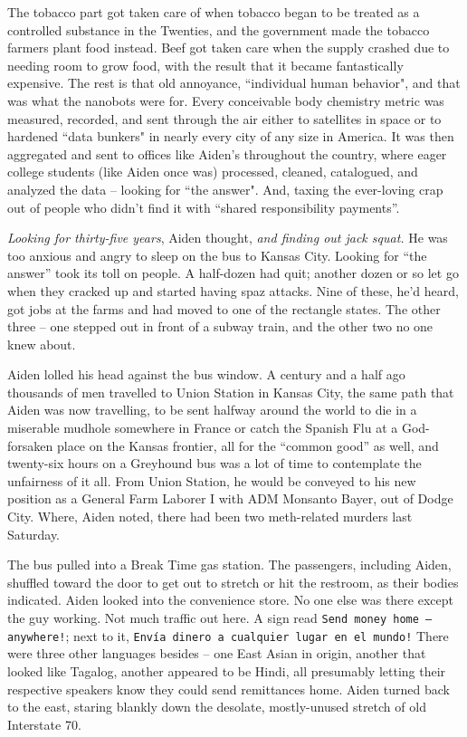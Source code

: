 \documentclass[11pt]{book}
\begin{document}
	The tobacco part got taken care of when tobacco began to be treated as a controlled substance in the Twenties, and the government made the tobacco farmers plant food instead. Beef got taken care when the supply crashed due to needing room to grow food, with the result that it became fantastically expensive. The rest is that old annoyance, ``individual human behavior", and that was what the nanobots were for. Every conceivable body chemistry metric was measured, recorded, and sent through the air either to satellites in space or to hardened ``data bunkers" in nearly every city of any size in America. It was then aggregated and sent to offices like Aiden's throughout the country, where eager college students (like Aiden once was) processed, cleaned, catalogued, and analyzed the data -- looking for ``the answer". And, taxing the ever-loving crap out of people who didn't find it with ``shared responsibility payments''.
	
	\textit{Looking for thirty-five years}, Aiden thought, \textit{and finding out jack squat.} He was too anxious and angry to sleep on the bus to Kansas City. Looking for ``the answer'' took its toll on people. A half-dozen had quit; another dozen or so let go when they cracked up and started having spaz attacks. Nine of these, he'd heard, got jobs at the farms and had moved to one of the rectangle states. The other three -- one stepped out in front of a subway train, and the other two no one knew about.
	
	Aiden lolled his head against the bus window. A century and a half ago thousands of men travelled to Union Station in Kansas City, the same path that Aiden was now travelling, to be sent halfway around the world to die in a miserable mudhole somewhere in France or catch the Spanish Flu at a God-forsaken place on the Kansas frontier, all for the ``common good'' as well, and twenty-six hours on a Greyhound bus was a lot of time to contemplate the unfairness of it all. From Union Station, he would be conveyed to his new position as a General Farm Laborer I with ADM Monsanto Bayer, out of Dodge City. Where, Aiden noted, there had been two meth-related murders last Saturday.
	
	The bus pulled into a Break Time gas station. The passengers, including Aiden, shuffled toward the door to get out to stretch or hit the restroom, as their bodies indicated. Aiden looked into the convenience store. No one else was there except the guy working. Not much traffic out here. A sign read \texttt{Send money home -- anywhere!}; next to it, \texttt{\textexclamdown Envía dinero a cualquier lugar en el mundo!} There were three other languages besides -- one East Asian in origin, another that looked like Tagalog, another appeared to be Hindi, all presumably letting their respective speakers know they could send remittances home. Aiden turned back to the east, staring blankly down the desolate, mostly-unused stretch of old Interstate 70.
	
\end{document}
